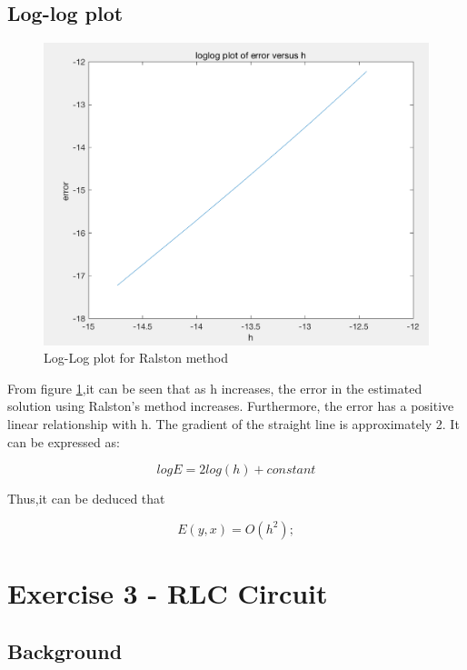 \documentclass[11pt,a4paper]{article}
\begin{document}
\subsection{Log-log plot}
\begin{figure}[h]
    \centering
    \includegraphics[scale=0.5]{Ex2_Figs/errorloglogfinal1}
    \caption{Log-Log plot for Ralston method}
    \label{fig:heun_error_loglog} %
\end{figure}

From figure \ref{fig:heun_error_loglog},it can be seen that as h increases, the error in the estimated solution using Ralston's method increases. Furthermore, the error has a positive linear relationship with h. The gradient of the straight line is approximately 2. It can be expressed as:

\begin{equation}
logE=2log(h)+constant
\end{equation}

Thus,it can be deduced that

\begin{equation}
E(y,x)=O(h^2);
\end{equation}



\pagebreak
\section{Exercise 3 - RLC Circuit}\vspace{-1mm}
\subsection{Background}
\end{document}
